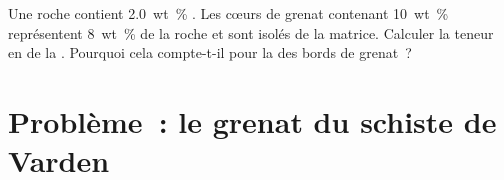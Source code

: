 \begin{exercise}[$\star\star\star$]\label{exo:b3:petrological-thermodynamics:12}
Une roche contient \qty{2.0}{wt\percent} . Les cœurs de grenat contenant
\qty{10}{wt\percent}  représentent \qty{8}{wt\percent} de la roche et sont
isolés de la matrice. Calculer la teneur en  de la . Pourquoi cela compte-t-il pour la  des bords de grenat~?
\end{exercise}

\section{Problème~: le grenat du schiste de Varden}

